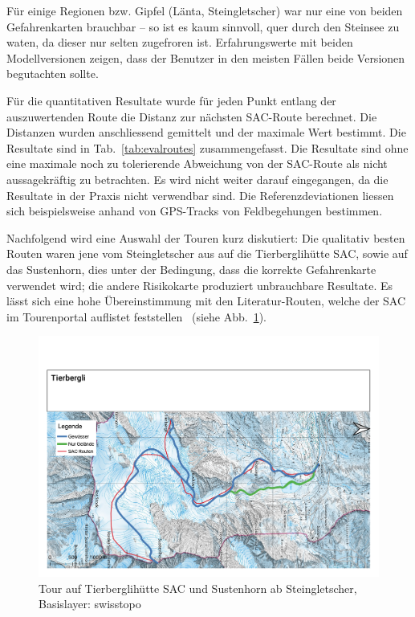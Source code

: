 Für einige Regionen bzw. Gipfel (Länta, Steingletscher) war nur eine von beiden Gefahrenkarten brauchbar -- so ist es kaum sinnvoll, quer durch den Steinsee zu waten, da dieser nur selten zugefroren ist. Erfahrungswerte mit beiden Modellversionen zeigen, dass der Benutzer in den meisten Fällen beide Versionen begutachten sollte.

Für die quantitativen Resultate wurde für jeden Punkt entlang der auszuwertenden Route die Distanz zur nächsten SAC-Route berechnet. Die Distanzen wurden anschliessend gemittelt und der maximale Wert bestimmt. Die Resultate sind in Tab.\ \ref{tab:evalroutes} zusammengefasst. Die Resultate sind ohne eine maximale noch zu tolerierende Abweichung von der SAC-Route als nicht aussagekräftig zu betrachten. Es wird nicht weiter darauf eingegangen, da die Resultate in der Praxis nicht verwendbar sind. Die Referenzdeviationen liessen sich beispielsweise anhand von GPS-Tracks von Feldbegehungen bestimmen.

Nachfolgend wird eine Auswahl der Touren kurz diskutiert: Die qualitativ besten Routen waren jene vom Steingletscher aus auf die Tierberglihütte SAC, sowie auf das Sustenhorn, dies unter der Bedingung, dass die korrekte Gefahrenkarte verwendet wird; die andere Risikokarte produziert unbrauchbare Resultate. Es lässt sich eine hohe Übereinstimmung mit den Literatur-Routen, welche der SAC im Tourenportal auflistet feststellen~\cite{mmzentralch} (siehe Abb.\ \ref{fig:tierbergli}).
\begin{figure}[ht]
  \centering
  \includegraphics[page=1,width=.9\linewidth]{./../evaluation/PDFs/Tierbergli.pdf}
  \caption{Tour auf Tierberglihütte SAC und Sustenhorn ab Steingletscher, \\Basislayer: swisstopo}\label{fig:tierbergli}
\end{figure}

